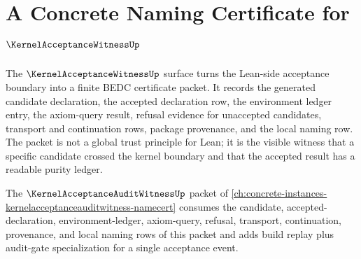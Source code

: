 \chapter{A Concrete Naming Certificate for $\KernelAcceptanceWitnessUp$}
\label{ch:concrete-instances-kernelacceptancewitness-namecert}

The $\KernelAcceptanceWitnessUp$ surface turns the Lean-side acceptance boundary into a finite BEDC certificate packet. It records the generated candidate declaration, the accepted declaration row, the environment ledger entry, the axiom-query result, refusal evidence for unaccepted candidates, transport and continuation rows, package provenance, and the local naming row. The packet is not a global trust principle for Lean; it is the visible witness that a specific candidate crossed the kernel boundary and that the accepted result has a readable purity ledger.

The $\KernelAcceptanceAuditWitnessUp$ packet of \autoref{ch:concrete-instances-kernelacceptanceauditwitness-namecert} consumes the candidate, accepted-declaration, environment-ledger, axiom-query, refusal, transport, continuation, provenance, and local naming rows of this packet and adds build replay plus audit-gate specialization for a single acceptance event.

